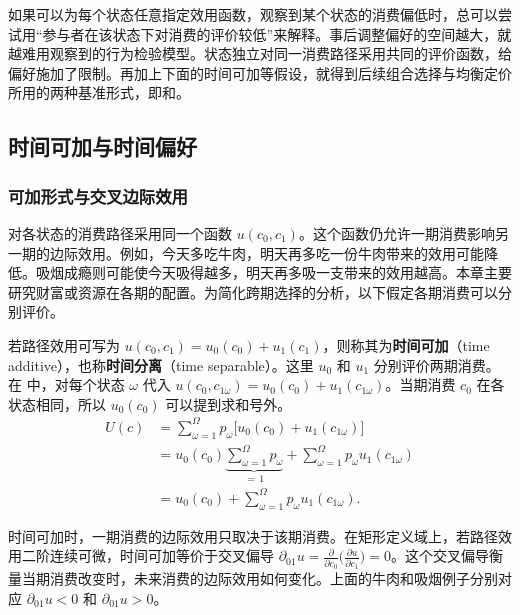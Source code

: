 如果可以为每个状态任意指定效用函数，观察到某个状态的消费偏低时，总可以尝试用“参与者在该状态下对消费的评价较低”来解释。事后调整偏好的空间越大，就越难用观察到的行为检验模型。状态独立对同一消费路径采用共同的评价函数，给偏好施加了限制。再加上下面的时间可加等假设，就得到后续组合选择与均衡定价所用的两种基准形式，即和。

\subsection{时间可加与时间偏好}
\subsubsection{可加形式与交叉边际效用}
 对各状态的消费路径采用同一个函数 $u(c_0,c_1)$。这个函数仍允许一期消费影响另一期的边际效用。例如，今天多吃牛肉，明天再多吃一份牛肉带来的效用可能降低。吸烟成瘾则可能使今天吸得越多，明天再多吸一支带来的效用越高。本章主要研究财富或资源在各期的配置。为简化跨期选择的分析，以下假定各期消费可以分别评价。

\begin{tcolorbox}[knowledge,title=时间可加性]
若路径效用可写为 $u(c_0,c_1)=u_0(c_0)+u_1(c_1)$，则称其为\textbf{时间可加}（time additive），也称\textbf{时间分离}（time separable）。这里 $u_0$ 和 $u_1$ 分别评价两期消费。在 中，对每个状态 $\omega$ 代入 $u(c_0,c_{1\omega})=u_0(c_0)+u_1(c_{1\omega})$。当期消费 $c_0$ 在各状态相同，所以 $u_0(c_0)$ 可以提到求和号外。
\begin{equation}
 \begin{aligned}
 U(c)
 &=\sum_{\omega=1}^{\Omega}p_\omega
    \bigl[u_0(c_0)+u_1(c_{1\omega})\bigr]\\
 &=u_0(c_0)\underbrace{\sum_{\omega=1}^{\Omega}p_\omega}_{=\,1}
   +\sum_{\omega=1}^{\Omega}p_\omega u_1(c_{1\omega})\\
 &=u_0(c_0)+\sum_{\omega=1}^{\Omega}p_\omega u_1(c_{1\omega}).
 \end{aligned}
 \label{eq:wj-six-3}
\end{equation}
\end{tcolorbox}
\begin{tcolorbox}[knowledge,title=时间可加与交叉边际效用]
时间可加时，一期消费的边际效用只取决于该期消费。在矩形定义域上，若路径效用二阶连续可微，时间可加等价于交叉偏导 $\partial_{01}u=\frac{\partial}{\partial c_0}\bigl(\frac{\partial u}{\partial c_1}\bigr)=0$。这个交叉偏导衡量当期消费改变时，未来消费的边际效用如何变化。上面的牛肉和吸烟例子分别对应 $\partial_{01}u<0$ 和 $\partial_{01}u>0$。
\end{tcolorbox}

